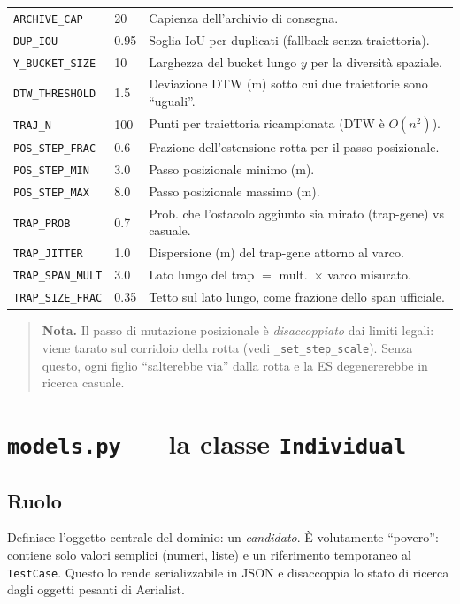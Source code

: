 \documentclass[11pt,a4paper]{report}
\newcommand{\code}[1]{\texttt{#1}}
\begin{document}
\begin{longtable}{L{3.6cm} L{1.8cm} L{8.6cm}}
\code{ARCHIVE\_CAP} & 20 & Capienza dell'archivio di consegna.\\
\code{DUP\_IOU} & 0.95 & Soglia IoU per duplicati (fallback senza traiettoria).\\
\code{Y\_BUCKET\_SIZE} & 10 & Larghezza del bucket lungo $y$ per la diversità spaziale.\\
\code{DTW\_THRESHOLD} & 1.5 & Deviazione DTW (m) sotto cui due traiettorie sono ``uguali''.\\
\code{TRAJ\_N} & 100 & Punti per traiettoria ricampionata (DTW è $O(n^2)$).\\
\code{POS\_STEP\_FRAC} & 0.6 & Frazione dell'estensione rotta per il passo posizionale.\\
\code{POS\_STEP\_MIN} & 3.0 & Passo posizionale minimo (m).\\
\code{POS\_STEP\_MAX} & 8.0 & Passo posizionale massimo (m).\\
\code{TRAP\_PROB} & 0.7 & Prob. che l'ostacolo aggiunto sia mirato (trap-gene) vs casuale.\\
\code{TRAP\_JITTER} & 1.0 & Dispersione (m) del trap-gene attorno al varco.\\
\code{TRAP\_SPAN\_MULT} & 3.0 & Lato lungo del trap $=$ mult.\ $\times$ varco misurato.\\
\code{TRAP\_SIZE\_FRAC} & 0.35 & Tetto sul lato lungo, come frazione dello span ufficiale.\\
\bottomrule
\end{longtable}

\begin{quote}
\textbf{Nota.} Il passo di mutazione posizionale è \emph{disaccoppiato}
dai limiti legali: viene tarato sul corridoio della rotta (vedi
\code{\_set\_step\_scale}). Senza questo, ogni figlio ``salterebbe via''
dalla rotta e la ES degenererebbe in ricerca casuale.
\end{quote}

\section{\texttt{models.py} --- la classe \texttt{Individual}}
\label{sec:models}

\subsection{Ruolo}
Definisce l'oggetto centrale del dominio: un \emph{candidato}. È
volutamente ``povero'': contiene solo valori semplici (numeri, liste) e
un riferimento temporaneo al \code{TestCase}. Questo lo rende
serializzabile in JSON e disaccoppia lo stato di ricerca dagli oggetti
pesanti di Aerialist.
\end{document}
